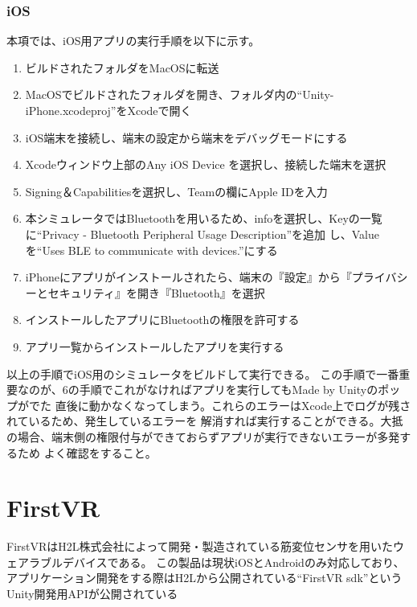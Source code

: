 \documentclass{ltjsreport}
\begin{document}
			\subsubsection{iOS}
				本項では、iOS用アプリの実行手順を以下に示す。
				\begin{enumerate}
					\item ビルドされたフォルダをMacOSに転送
					\item MacOSでビルドされたフォルダを開き、フォルダ内の``Unity-iPhone.xcodeproj''をXcodeで開く
					\item iOS端末を接続し、端末の設定から端末をデバッグモードにする
					\item Xcodeウィンドウ上部のAny iOS Device を選択し、接続した端末を選択
					\item Signing＆Capabilitiesを選択し、Teamの欄にApple IDを入力
					\item 本シミュレータではBluetoothを用いるため、infoを選択し、Keyの一覧に``Privacy - Bluetooth Peripheral Usage Description''を追加
						し、Valueを``Uses BLE to communicate with devices.''にする
					\item iPhoneにアプリがインストールされたら、端末の『設定』から『プライバシーとセキュリティ』を開き『Bluetooth』を選択
					\item インストールしたアプリにBluetoothの権限を許可する
					\item アプリ一覧からインストールしたアプリを実行する
				\end{enumerate}
				以上の手順でiOS用のシミュレータをビルドして実行できる。
				この手順で一番重要なのが、6の手順でこれがなければアプリを実行してもMade by Unityのポップがでた
				直後に動かなくなってしまう。これらのエラーはXcode上でログが残されているため、発生しているエラーを
				解消すれば実行することができる。大抵の場合、端末側の権限付与ができておらずアプリが実行できないエラーが多発するため
				よく確認をすること。
	\section{FirstVR}
		FirstVRはH2L株式会社\cite{ref:6}によって開発・製造されている筋変位センサを用いたウェアラブルデバイスである。
		この製品は現状iOSとAndroidのみ対応しており、アプリケーション開発をする際はH2Lから公開されている``FirstVR sdk''というUnity開発用APIが公開されている
\end{document}
